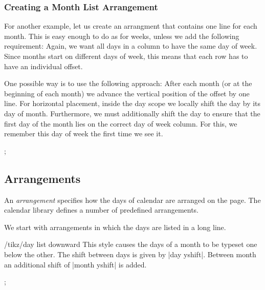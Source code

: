 \subsubsection{Creating a Month List Arrangement}

For another example, let us create an arrangment that contains one
line for each month. This is easy enough to do as for weeks, unless we
add the following requirement: Again, we want all days in a column to
have the same day of week. Since months start on different days of
week, this means that each row has to have an individual offset.

One possible way is to use the following approach: After each month
(or at the beginning of each month) we advance the vertical position
of the offset by one line. For horizontal placement, inside the day
scope we locally shift the day by its day of month. Furthermore, we
must additionally shift the day to ensure that the first day of the
month lies on the correct day of week column. For this, we remember
this day of week the first time we see it.
\begin{codeexample}[]
\newcount\mycount
\tikz
  \calendar
    [dates=2000-01-01 to 2000-02-last,
     execute before day scope=
     {
       \ifdate{day of month=1} {
         \mycount=\pgfcalendarcurrentweekday
         \pgftransformyshift{-1em}
       }{}
     },
     execute at begin day scope=
     {
       \pgftransformxshift{\pgfcalendarcurrentday em}
       \pgftransformxshift{\the\mycount em}
     }];
\end{codeexample}


\subsection{Arrangements}

An \emph{arrangement} specifies how the days of calendar are arranged
on the page. The calendar library defines a number of predefined
arrangements.

We start with arrangements in which the days are listed in a long
line. 

\begin{stylekey}{/tikz/day list downward}
  This style causes the days of a month to be typeset one below the
  other. The shift between days is given by |day yshift|. Between
  month an additional shift of |month yshift| is added.
\begin{codeexample}[]
\tikz
  \calendar [dates=2000-01-28 to 2000-02-03,
             day list downward,month yshift=1em];
\end{codeexample}
\end{stylekey}

